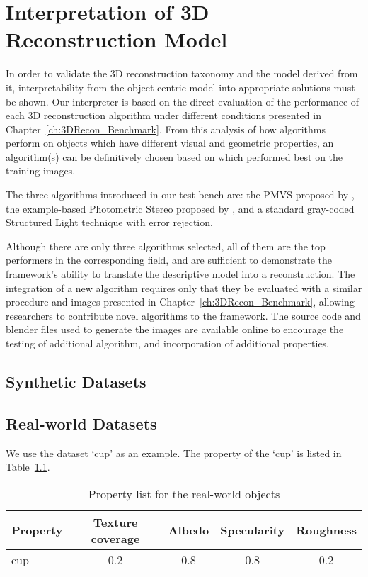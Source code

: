 
\chapter{Interpretation of 3D Reconstruction Model}
\label{ch:3DRecon_Interp}
In order to validate the 3D reconstruction taxonomy and the model derived from it, interpretability from the object centric model into appropriate solutions must be shown. Our interpreter is based on the direct evaluation of the performance of each 3D reconstruction algorithm under different conditions presented in Chapter~\ref{ch:3DRecon_Benchmark}. From this analysis of how algorithms perform on objects which have different visual and geometric properties, an algorithm(s) can be definitively chosen based on which performed best on the training images.

The three algorithms introduced in our test bench are: the PMVS proposed by \citeauthor{furukawa2010accurate}, the example-based Photometric Stereo proposed by \citeauthor{hertzmann2005example}, and a standard gray-coded Structured Light technique with error rejection.

Although there are only three algorithms selected, all of them are the top performers in the corresponding field, and are sufficient to demonstrate the framework's ability to translate the descriptive model into a reconstruction. The integration of a new algorithm requires only that they be evaluated with a similar procedure and images presented in Chapter~\ref{ch:3DRecon_Benchmark}, allowing researchers to contribute novel algorithms to the framework. The source code and blender files used to generate the images are available online to encourage the testing of additional algorithm, and incorporation of additional properties.

\section{Synthetic Datasets}


\section{Real-world Datasets}
We use the dataset `cup' as an example. The property of the `cup' is listed in Table~\ref{tab:prop_list_cup}.

\begin{table}[h]
  \centering
  \begin{tabular}{l*{4}{c}}
  \hline
  \textbf{Property} & Texture coverage & Albedo & Specularity & Roughness\\
  \hline
  cup & 0.2 & 0.8 & 0.8 & 0.2\\
  \hline
  \end{tabular}
  \label{tab:prop_list_cup}
  \caption{Property list for the real-world objects}
\end{table}

